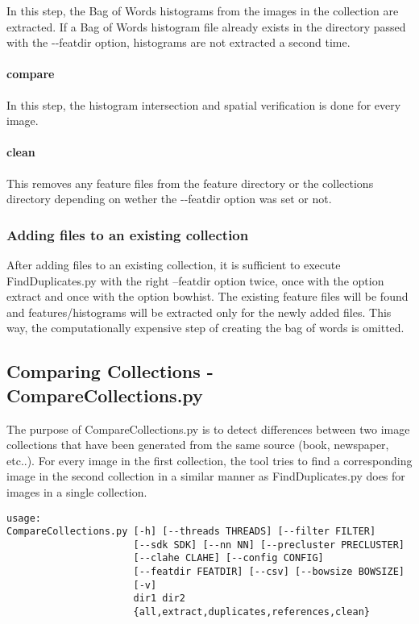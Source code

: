\documentclass{hitec}
\begin{document}
In this step, the Bag of Words histograms from the images in the collection are extracted.
If a Bag of Words histogram file already exists in the directory passed with the {\ttfamily -{}-featdir} option,
histograms are not extracted a second time.

\paragraph{\ttfamily compare}

In this step, the histogram intersection and spatial verification is done for every image.

\paragraph{\ttfamily clean}

This removes any feature files from the feature directory or the collections directory
depending on wether the {\ttfamily -{}-featdir} option was set or not.


\subsubsection*{Adding files to an existing collection}

After adding files to an existing collection, it is sufficient to execute
FindDuplicates.py with the right --featdir option twice, once with the option
extract and once with the option bowhist. The existing feature files will be
found and features/histograms will be extracted only for the newly added files.
This way, the computationally expensive step of creating the bag of words is
omitted. 

\subsection{Comparing Collections - CompareCollections.py}

The purpose of {\ttfamily CompareCollections.py} is to detect differences 
between two image collections that have been generated from the same source (book, newspaper, etc..).
For every image in the first collection, the tool tries to find a corresponding image in the second collection
in a similar manner as {\ttfamily FindDuplicates.py} does for images in a single collection.



\begin{verbatim}
usage: 
CompareCollections.py [-h] [--threads THREADS] [--filter FILTER]
                      [--sdk SDK] [--nn NN] [--precluster PRECLUSTER]
                      [--clahe CLAHE] [--config CONFIG]
                      [--featdir FEATDIR] [--csv] [--bowsize BOWSIZE]
                      [-v]
                      dir1 dir2
                      {all,extract,duplicates,references,clean}
\end{verbatim}
\end{document}
